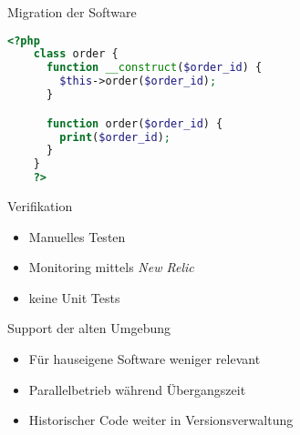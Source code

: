 \begin{frame}[fragile] {Migration der Software}
    \begin{lstlisting}[language=php]
    <?php
    class order {
      function __construct($order_id) {
        $this->order($order_id);
      }

      function order($order_id) {
        print($order_id);
      }
    }
    ?>
    \end{lstlisting}
\end{frame}

\begin{frame}{Verifikation}
    \begin{itemize}
        \item Manuelles Testen
        \item Monitoring mittels \emph{New Relic}
        \item keine Unit Tests
    \end{itemize}
\end{frame}

\begin{frame}{Support der alten Umgebung}
    \begin{itemize}
        \item Für hauseigene Software weniger relevant
        \item Parallelbetrieb während Übergangszeit
        \item Historischer Code weiter in Versionsverwaltung
    \end{itemize}
\end{frame}